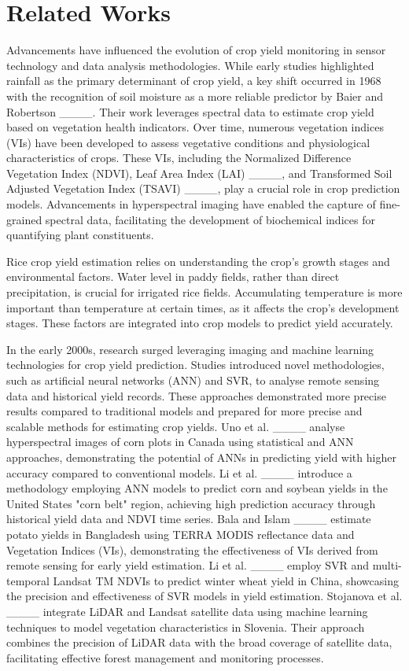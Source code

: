 \section{Related Works}
\label{sec:related}
Advancements have influenced the evolution of crop yield monitoring in sensor technology and data analysis methodologies. While early studies highlighted rainfall as the primary determinant of crop yield, a key shift occurred in 1968 with the recognition of soil moisture as a more reliable predictor by Baier and Robertson ____. Their work leverages spectral data to estimate crop yield based on vegetation health indicators. Over time, numerous vegetation indices (VIs) have been developed to assess vegetative conditions and physiological characteristics of crops. These VIs, including the Normalized Difference Vegetation Index (NDVI), Leaf Area Index (LAI) ____, and Transformed Soil Adjusted Vegetation Index (TSAVI) ____, play a crucial role in crop prediction models. Advancements in hyperspectral imaging have enabled the capture of fine-grained spectral data, facilitating the development of biochemical indices for quantifying plant constituents.

Rice crop yield estimation relies on understanding the crop's growth stages and environmental factors. Water level in paddy fields, rather than direct precipitation, is crucial for irrigated rice fields. Accumulating temperature is more important than temperature at certain times, as it affects the crop's development stages. These factors are integrated into crop models to predict yield accurately.

In the early 2000s, research surged leveraging imaging and machine learning technologies for crop yield prediction. Studies introduced novel methodologies, such as artificial neural networks (ANN) and SVR, to analyse remote sensing data and historical yield records. These approaches demonstrated more precise results compared to traditional models and prepared for more precise and scalable methods for estimating crop yields. Uno et al. ____ analyse hyperspectral images of corn plots in Canada using statistical and ANN approaches, demonstrating the potential of ANNs in predicting yield with higher accuracy compared to conventional models. Li et al. ____ introduce a methodology employing ANN models to predict corn and soybean yields in the United States "corn belt" region, achieving high prediction accuracy through historical yield data and NDVI time series. Bala and Islam ____ estimate potato yields in Bangladesh using TERRA MODIS reflectance data and Vegetation Indices (VIs), demonstrating the effectiveness of VIs derived from remote sensing for early yield estimation. Li et al. ____ employ SVR and multi-temporal Landsat TM NDVIs to predict winter wheat yield in China, showcasing the precision and effectiveness of SVR models in yield estimation. Stojanova et al. ____ integrate LiDAR and Landsat satellite data using machine learning techniques to model vegetation characteristics in Slovenia. Their approach combines the precision of LiDAR data with the broad coverage of satellite data, facilitating effective forest management and monitoring processes.

